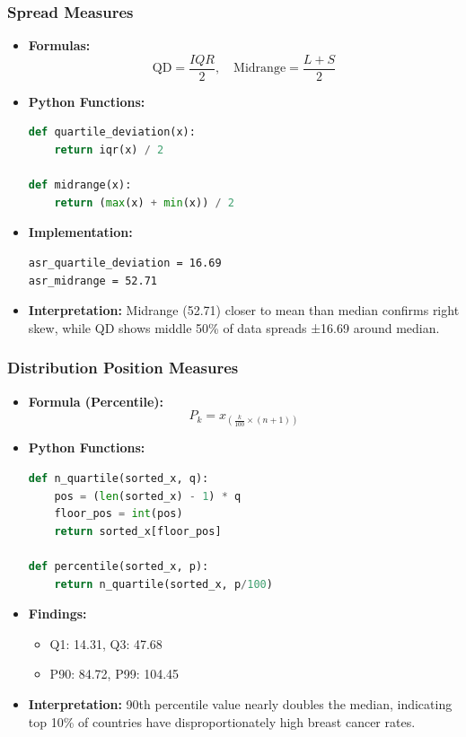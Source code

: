 \begin{frame}[fragile]
    \frametitle{Spread Measures}
    \begin{itemize}
        \item \textbf{Formulas:}
        \[
        \text{QD} = \frac{IQR}{2},\quad \text{Midrange} = \frac{L + S}{2}
        \]
        
        \item \textbf{Python Functions:}
        \begin{lstlisting}[language=Python, breaklines=true]
def quartile_deviation(x):
    return iqr(x) / 2

def midrange(x):
    return (max(x) + min(x)) / 2
        \end{lstlisting}
        
        \item \textbf{Implementation:}
        \begin{lstlisting}
asr_quartile_deviation = 16.69
asr_midrange = 52.71
        \end{lstlisting}
        
        \item \textbf{Interpretation:} Midrange (\SI{52.71}{\perthousand}) closer to mean than median confirms right skew, while QD shows middle 50\% of data spreads ±16.69 around median.
    \end{itemize}
\end{frame}

\begin{frame}[fragile]
    \frametitle{Distribution Position Measures}
    \begin{itemize}
        \item \textbf{Formula (Percentile):}
        \[
        P_k = x_{(\frac{k}{100} \times (n + 1))}
        \]
        
        \item \textbf{Python Functions:}
        \begin{lstlisting}[language=Python, breaklines=true]
def n_quartile(sorted_x, q):
    pos = (len(sorted_x) - 1) * q
    floor_pos = int(pos)
    return sorted_x[floor_pos]

def percentile(sorted_x, p):
    return n_quartile(sorted_x, p/100)
        \end{lstlisting}
        
        \item \textbf{Findings:}
        \begin{itemize}
            \item Q1: \SI{14.31}{\perthousand}, Q3: \SI{47.68}{\perthousand}
            \item P90: \SI{84.72}{\perthousand}, P99: \SI{104.45}{\perthousand}
        \end{itemize}
        
        \item \textbf{Interpretation:} 90th percentile value nearly doubles the median, indicating top 10\% of countries have disproportionately high breast cancer rates.
    \end{itemize}
\end{frame}